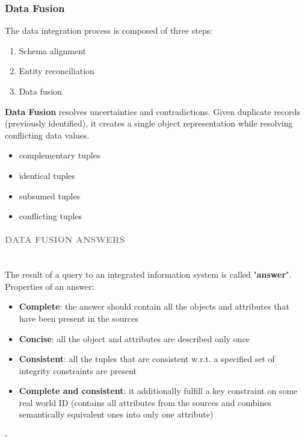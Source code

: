 \documentclass[10pt,a4paper]{article}
\newcommand{\myparagraph}[1]{\paragraph{\normalsize{\textcolor{gray}{\uppercase{\textbf{#1}}}} }\mbox{} \vspace{0.5em}\\}
\begin{document}
\subsubsection{Data Fusion}
The data integration process is composed of three steps:
\begin{enumerate}
	\item Schema alignment
	\item Entity reconciliation
	\item Data fusion
\end{enumerate}
\textbf{Data Fusion} resolves uncertainties and contradictions. Given duplicate records (previously identified), it creates a single object representation while resolving conflicting data values.
\begin{itemize}
	\item complementary tuples
	\item identical tuples
	\item subsumed tuples
	\item conflicting tuples
\end{itemize}
\myparagraph{Data Fusion ANSWERS}
The result of a query to an integrated information system is called "\textbf{answer}". \\ 
Properties of an answer:
\begin{itemize}
	\item \textbf{Complete}: the answer should contain all the objects and attributes that have been present in the sources
	\item \textbf{Concise}: all the object and attributes are described only once
	\item \textbf{Consistent}: all the tuples that are consistent w.r.t. a specified set of integrity constraints are present
	\item \textbf{Complete and consistent}: it additionally fulfill a key constraint on some real world ID (contains all attributes from the sources and combines semantically equivalent ones into only one attribute)
\end{itemize}
- 
\end{document}
